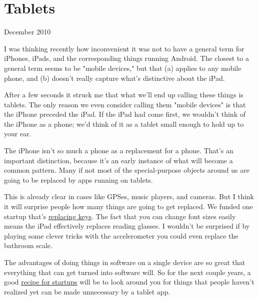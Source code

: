 \chapter{Tablets}


            
              
                

December 2010

I was thinking recently how
                  inconvenient it was not to have a general term for iPhones,
                  iPads, and the corresponding things running Android. The
                  closest to a general term seems to be "mobile devices," but
                  that (a) applies to any mobile phone, and (b) doesn't really
                  capture what's distinctive about the iPad.

After a
                  few seconds it struck me that what we'll end up calling these
                  things is tablets. The only reason we even consider calling
                  them "mobile devices" is that the iPhone preceded the iPad. If
                  the iPad had come first, we wouldn't think of the iPhone as a
                  phone; we'd think of it as a tablet small enough to hold up to
                  your ear.

The iPhone isn't so much a phone as a
                  replacement for a phone. That's an important distinction,
                  because it's an early instance of what will become a common
                  pattern. Many if not most of the special-purpose objects
                  around us are going to be replaced by apps running on
                  tablets.

This is already clear in cases like GPSes,
                  music players, and cameras. But I think it will surprise
                  people how many things are going to get replaced. We funded
                  one startup that's
                  \href{http://lockitron.com/}{replacing keys}. The fact
                  that you can change font sizes easily means the iPad
                  effectively replaces reading glasses. I wouldn't be surprised
                  if by playing some clever tricks with the accelerometer you
                  could even replace the bathroom scale.

The
                  advantages of doing things in software on a single device are
                  so great that everything that can get turned into software
                  will. So for the next couple years, a good
                  \href{http://ycombinator.com/rfs8.html}{recipe for startups}
                  will be to look around you for things that people haven't
                  realized yet can be made unnecessary by a tablet app.

